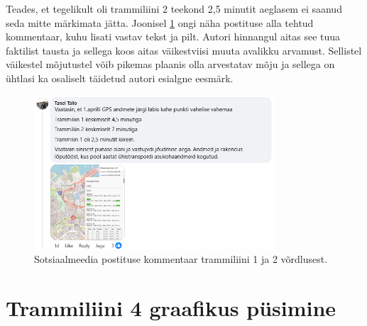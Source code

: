 Teades, et tegelikult oli trammiliini 2 teekond 2,5 minutit aeglasem  ei saanud seda mitte märkimata jätta. Joonisel \ref{fig:facebookiPostitus} ongi näha postituse alla tehtud kommentaar, kuhu lisati vastav tekst ja pilt. Autori hinnangul aitas see tuua faktilist tausta ja sellega koos aitas väikestviisi muuta avalikku arvamust. Sellistel väikestel mõjutustel võib pikemas plaanis olla arvestatav mõju ja sellega on ühtlasi ka osaliselt täidetud autori esialgne eesmärk. 
\begin{figure}[h!]
    \centering
    \includegraphics[width=0.8\textwidth]{figures/facebookiPostitus.png}
    \caption{Sotsiaalmeedia postituse kommentaar trammiliini 1 ja 2 võrdlusest.}
    \label{fig:facebookiPostitus}
\end{figure}

\section{Trammiliini 4 graafikus püsimine}

